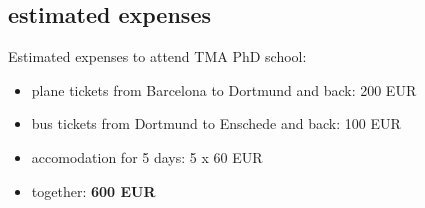 \documentclass[]{friggeri-cv} %
\begin{document}
\subsection{estimated expenses}

Estimated expenses to attend TMA PhD school:
\begin{itemize}
	\item plane tickets from Barcelona to Dortmund and back: 200 EUR
	\item bus tickets from Dortmund to Enschede and back: 100 EUR
	\item accomodation for 5 days: 5 x 60 EUR
	\item together: \bf{600 EUR}
\end{itemize}
\end{document}

